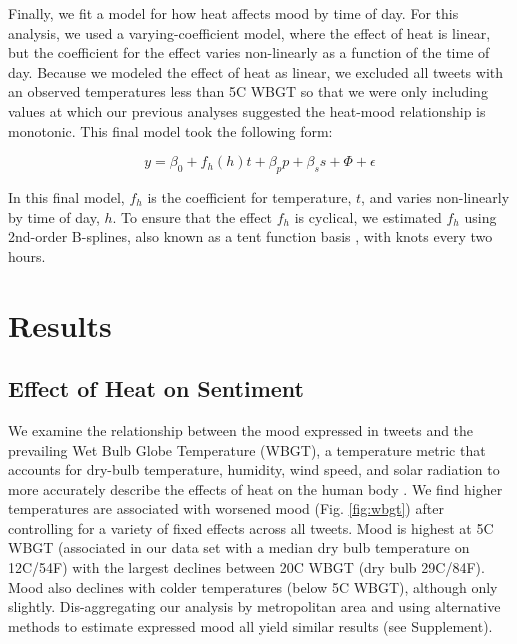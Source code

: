 \documentclass[titlepage]{article}
\begin{document}
Finally, we fit a model for how heat affects mood by time of day. For this analysis, we used a varying-coefficient model, where the effect of heat is linear, but the coefficient for the effect varies non-linearly as a function of the time of day. Because we modeled the effect of heat as linear, we excluded all tweets with an observed temperatures less than 5\textdegree C WBGT so that we were only including values at which our previous analyses suggested the heat-mood relationship is monotonic. This final model took the following form:

\begin{equation}
 y = \beta_0 + f_h(h)t + \beta_p p + \beta_s s + \Phi + \epsilon
 \label{mod:tod}
\end{equation}

In this final model, $f_{h}$ is the coefficient for temperature, $t$, and varies non-linearly by time of day, $h$. To ensure that the effect $f_{h}$ is cyclical, we estimated $f_{h}$ using 2nd-order B-splines, also known as a tent function basis \cite[Chapter~4.2]{wood2017generalized}, with knots every two hours.

\section*{Results}

\subsection*{Effect of Heat on Sentiment}
We examine the relationship between the mood expressed in tweets and the prevailing Wet Bulb Globe Temperature (WBGT), a temperature metric that accounts for dry-bulb temperature, humidity, wind speed, and solar radiation to more accurately describe the effects of heat on the human body \citep{budd2008wet}. We find higher temperatures are associated with worsened mood (Fig. \ref{fig:wbgt}) after controlling for a variety of fixed effects across all tweets. Mood is highest at 5\textdegree C WBGT (associated in our data set with a median dry bulb temperature on 12\textdegree C/54\textdegree F) with the largest declines between 20\textdegree C WBGT (dry bulb 29\textdegree C/84\textdegree F). Mood also declines with colder temperatures (below 5\textdegree C WBGT), although only slightly. Dis-aggregating our analysis by metropolitan area and using alternative methods to estimate expressed mood all yield similar results (see Supplement).
\end{document}

